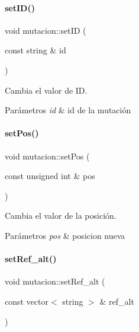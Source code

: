\paragraph{\texorpdfstring{set\+I\+D()}{setID()}}
{\footnotesize\ttfamily void mutacion\+::set\+ID (\begin{DoxyParamCaption}\item[{const string \&}]{id }\end{DoxyParamCaption})}



Cambia el valor de ID. 


\begin{DoxyParams}{Parámetros}
{\em id} & id de la mutación \\
\hline
\end{DoxyParams}
\hypertarget{classmutacion_a2667189a28d3ac983a8f63ca92e81fba}{}\label{classmutacion_a2667189a28d3ac983a8f63ca92e81fba} 
\paragraph{\texorpdfstring{set\+Pos()}{setPos()}}
{\footnotesize\ttfamily void mutacion\+::set\+Pos (\begin{DoxyParamCaption}\item[{const unsigned int \&}]{pos }\end{DoxyParamCaption})}



Cambia el valor de la posición. 


\begin{DoxyParams}{Parámetros}
{\em pos} & posicion nueva \\
\hline
\end{DoxyParams}
\hypertarget{classmutacion_a66b8d594a0bddbe4262f7a13ef551d07}{}\label{classmutacion_a66b8d594a0bddbe4262f7a13ef551d07} 
\paragraph{\texorpdfstring{set\+Ref\+\_\+alt()}{setRef\_alt()}}
{\footnotesize\ttfamily void mutacion\+::set\+Ref\+\_\+alt (\begin{DoxyParamCaption}\item[{const vector$<$ string $>$ \&}]{ref\+\_\+alt }\end{DoxyParamCaption})}



